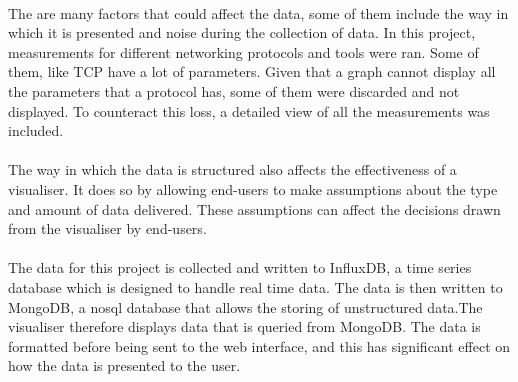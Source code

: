 \paragraph{}
The are many factors that could affect the data, some of them include the way in which it is presented and noise during the collection of data. In this project, measurements for different networking protocols and tools were ran. Some of them, like TCP have a lot of parameters. Given that a graph cannot display all the parameters that a protocol has, some of them were discarded and not displayed. To counteract this loss, a detailed view of all the measurements was included.
\paragraph{}
The way in which the data is structured also affects the effectiveness of a visualiser. It does so by allowing end-users to make assumptions about the type and amount of data delivered. These assumptions can affect the decisions drawn from the visualiser by end-users\cite{Knight2001}. 
\paragraph{}
The data for this project is collected and written to InfluxDB, a time series database which is designed to handle real time data. The data is then written to MongoDB, a nosql database that allows the storing of unstructured data.The visualiser therefore displays data that is queried from MongoDB. The data is formatted before being sent to the web interface, and this has significant effect on how the data is presented to the user.


